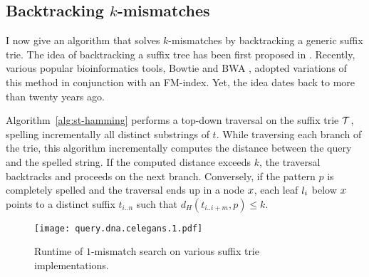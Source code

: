 %

\subsection{Backtracking $k$-mismatches}
\label{sec:index:algo:kmismatches}

I now give an algorithm that solves $k$-mismatches by backtracking a generic suffix trie.
The idea of backtracking a suffix tree has been first proposed in \citep{Ukkonen1993}.
Recently, various popular bioinformatics tools, \eg Bowtie \citep{Langmead2009} and BWA \citep{Li2009}, adopted variations of this method in conjunction with an FM-index.
Yet, the idea dates back to more than twenty years ago.

Algorithm~\ref{alg:st-hamming} performs a top-down traversal on the suffix trie $\mathcal {T}$, spelling incrementally all distinct substrings of $t$.
While traversing each branch of the trie, this algorithm incrementally computes the distance between the query and the spelled string.
If the computed distance exceeds $k$, the traversal backtracks and proceeds on the next branch.
Conversely, if the pattern $p$ is completely spelled and the traversal ends up in a node $x$, each leaf $l_i$ below $x$ points to a distinct suffix $t_{i..n}$ such that $d_H(t_{i..i+m}, p) \leq k$.

\begin{figure}[b]
\begin{center}
\caption[$k$-mismatches runtime]{Runtime of $1$-mismatch search on various suffix trie implementations.}
\label{fig:query-dna-apx}
\texttt{[image: query.dna.celegans.1.pdf]}
\end{center}
\end{figure}

